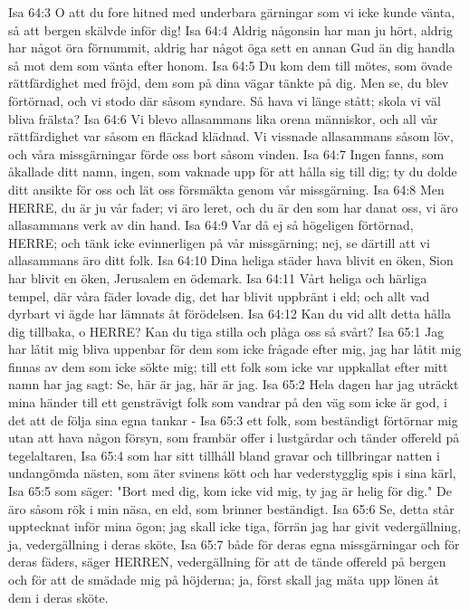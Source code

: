 Isa 64:3  O att du fore hitned med underbara gärningar som vi icke kunde vänta, så att bergen skälvde inför dig!
Isa 64:4  Aldrig någonsin har man ju hört, aldrig har något öra förnummit, aldrig har något öga sett en annan Gud än dig handla så mot dem som vänta efter honom.
Isa 64:5  Du kom dem till mötes, som övade rättfärdighet med fröjd, dem som på dina vägar tänkte på dig. Men se, du blev förtörnad, och vi stodo där såsom syndare. Så hava vi länge stått; skola vi väl bliva frälsta?
Isa 64:6  Vi blevo allasammans lika orena människor, och all vår rättfärdighet var såsom en fläckad klädnad. Vi vissnade allasammans såsom löv, och våra missgärningar förde oss bort såsom vinden.
Isa 64:7  Ingen fanns, som åkallade ditt namn, ingen, som vaknade upp för att hålla sig till dig; ty du dolde ditt ansikte för oss och lät oss försmäkta genom vår missgärning.
Isa 64:8  Men HERRE, du är ju vår fader; vi äro leret, och du är den som har danat oss, vi äro allasammans verk av din hand.
Isa 64:9  Var då ej så högeligen förtörnad, HERRE; och tänk icke evinnerligen på vår missgärning; nej, se därtill att vi allasammans äro ditt folk.
Isa 64:10  Dina heliga städer hava blivit en öken, Sion har blivit en öken, Jerusalem en ödemark.
Isa 64:11  Vårt heliga och härliga tempel, där våra fäder lovade dig, det har blivit uppbränt i eld; och allt vad dyrbart vi ägde har lämnats åt förödelsen.
Isa 64:12  Kan du vid allt detta hålla dig tillbaka, o HERRE? Kan du tiga stilla och plåga oss så svårt?
Isa 65:1  Jag har låtit mig bliva uppenbar för dem som icke frågade efter mig, jag har låtit mig finnas av dem som icke sökte mig; till ett folk som icke var uppkallat efter mitt namn har jag sagt: Se, här är jag, här är jag.
Isa 65:2  Hela dagen har jag uträckt mina händer till ett gensträvigt folk som vandrar på den väg som icke är god, i det att de följa sina egna tankar -
Isa 65:3  ett folk, som beständigt förtörnar mig utan att hava någon försyn, som frambär offer i lustgårdar och tänder offereld på tegelaltaren,
Isa 65:4  som har sitt tillhåll bland gravar och tillbringar natten i undangömda nästen, som äter svinens kött och har vederstygglig spis i sina kärl,
Isa 65:5  som säger: "Bort med dig, kom icke vid mig, ty jag är helig för dig." De äro såsom rök i min näsa, en eld, som brinner beständigt.
Isa 65:6  Se, detta står upptecknat inför mina ögon; jag skall icke tiga, förrän jag har givit vedergällning, ja, vedergällning i deras sköte,
Isa 65:7  både för deras egna missgärningar och för deras fäders, säger HERREN, vedergällning för att de tände offereld på bergen och för att de smädade mig på höjderna; ja, först skall jag mäta upp lönen åt dem i deras sköte.
